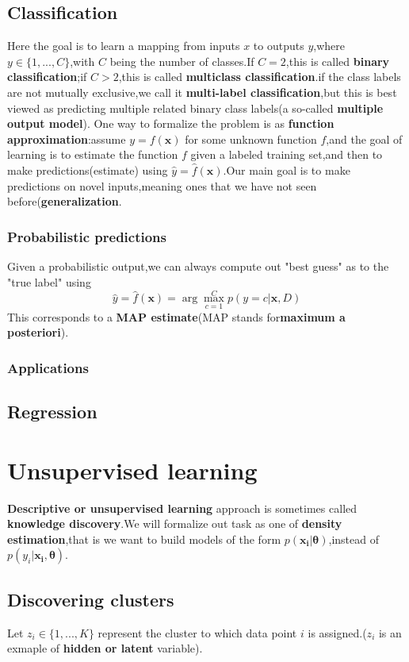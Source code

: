 \subsection{Classification}
  Here the goal is to learn a mapping from inputs $x$ to outputs $y$,where $y \in \{1,...,C\}$,with $C$ being the number of classes.If $C=2$,this is called \textbf{binary classification};if $C>2$,this is called \textbf{multiclass classification}.if the class labels are not mutually exclusive,we call it \textbf{multi-label classification},but this is best viewed as predicting multiple related binary class labels(a so-called \textbf{multiple output model}).
  One way to formalize the problem is as \textbf{function approximation}:assume $y=f(\mathbf{x})$ for some unknown function $f$,and the goal of learning is to estimate the function $f$ given a labeled training set,and then to make predictions(estimate) using $\hat{y} =\hat{f}(\mathbf{x})$.Our main goal is to make predictions on novel inputs,meaning ones that we have not seen before(\textbf{generalization}.
\subsubsection{Probabilistic predictions}
Given a probabilistic output,we can always compute out "best guess" as to the "true label" using
\begin{equation}
\hat{y} = \hat{f}(\mathbf{x}) = \arg\max\limits_{c=1}^{C} p(y=c|\mathbf{x},D)
\end{equation}
This corresponds to a \textbf{MAP estimate}(MAP stands for\textbf{maximum a posteriori}).
\subsubsection{Applications}
\subsection{Regression}

\section{Unsupervised learning}
  \textbf{Descriptive or unsupervised learning} approach is sometimes called \textbf{knowledge discovery}.We will formalize out task as one of \textbf{density estimation},that is we want to build models of the form $p(\mathbf{x_i|\theta})$,instead of $p(y_i|\mathbf{x_i,\theta})$.
\subsection{Discovering clusters}
Let $z_i \in \{1,...,K\}$ represent the cluster to which data point $i$ is assigned.($z_i$ is an exmaple of \textbf{hidden or latent} variable).
